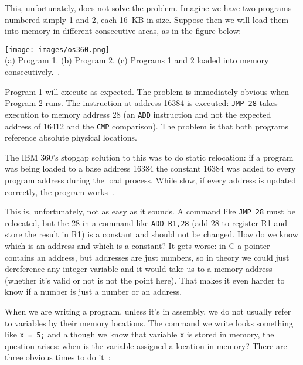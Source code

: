 This, unfortunately, does not solve the problem. Imagine we have two programs numbered simply 1 and 2, each 16~KB in size. Suppose then we will load them into memory in different consecutive areas, as in the figure below:

\begin{center}
\texttt{[image: images/os360.png]}\\
(a) Program 1. (b) Program 2. (c) Programs 1 and 2 loaded into memory consecutively.~\cite{mos}.
\end{center}

Program 1 will execute as expected. The problem is immediately obvious when Program 2 runs. The instruction at address 16384 is executed: \texttt{JMP 28} takes execution to memory address 28 (an \texttt{ADD} instruction and not the expected address of 16412 and the \texttt{CMP} comparison). The problem is that both programs reference absolute physical locations. 

The IBM 360's stopgap solution to this was to do static relocation: if a program was being loaded to a base address 16384 the constant 16384 was added to every program address during the load process. While slow, if every address is updated correctly, the program works~\cite{mos}.

This is, unfortunately, not as easy as it sounds. A command like \texttt{JMP 28} must be relocated, but the 28 in a command like \texttt{ADD R1,28} (add 28 to register R1 and store the result in R1) is a constant and should not be changed. How do we know which is an address and which is a constant? It gets worse: in C a pointer contains an address, but addresses are just numbers, so in theory we could just dereference any integer variable and it would take us to a memory address (whether it's valid or not is not the point here). That makes it even harder to know if a number is just a number or an address.

When we are writing a program, unless it's in assembly, we do not usually refer to variables by their memory locations. The command we write looks something like \texttt{x = 5;} and although we know that variable \texttt{x} is stored in memory, the question arises: when is the variable assigned a location in memory? There are three obvious times to do it~\cite{osc}:


